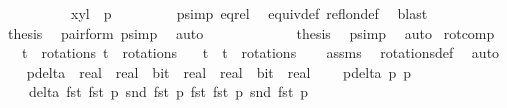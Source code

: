 \begin{isabellebody}
\ \ \isamarkupfalse%
\ {\isacharminus}\isanewline
\ \ \ \ \isamarkupfalse%
\ {\isachardoublequoteopen}{\isacharparenleft}{\isacharparenleft}x{\isacharcomma}y{\isacharparenright}{\isacharcomma}l{\isacharparenright}\ {\isasymin}\ p{\isachardoublequoteclose}\ \isanewline
\ \ \ \ \ \ \isamarkupfalse%
\ p{\isacharunderscore}simp\ eq{\isacharunderscore}rel\ \isamarkupfalse%
\ equiv{\isacharunderscore}def\ refl{\isacharunderscore}on{\isacharunderscore}def\ \isamarkupfalse%
\ blast\isanewline
\ \ \ \ \isamarkupfalse%
\ \isamarkupfalse%
\ {\isacharquery}thesis\ \isamarkupfalse%
\ pair{\isacharunderscore}form\ p{\isacharunderscore}simp\ \isamarkupfalse%
\ auto\isanewline
\ \ \isamarkupfalse%
\ \ \ \ \isanewline
\ \ \isamarkupfalse%
\ \isamarkupfalse%
\ {\isacharquery}thesis\ \isamarkupfalse%
\ p{\isacharunderscore}simp\ \isamarkupfalse%
\ auto\isanewline
{}\isamarkupfalse%
%
\endisatagproof
{\isafoldproof}%
%
\isadelimproof
\isanewline
%
\endisadelimproof
\isanewline
{}\isamarkupfalse%
\ rot{\isacharunderscore}comp{\isacharcolon}\isanewline
\ \ \ {\isachardoublequoteopen}t{}\ {\isasymin}\ rotations{\isachardoublequoteclose}\ {\isachardoublequoteopen}t{}\ {\isasymin}\ rotations{\isachardoublequoteclose}\isanewline
\ \ \ {\isachardoublequoteopen}t{}\ {\isasymcirc}\ t{}\ {\isasymin}\ rotations{\isachardoublequoteclose}\isanewline
%
\isadelimproof
\ \ %
\endisadelimproof
%
\isatagproof
{}\isamarkupfalse%
\ assms\ \isamarkupfalse%
\ rotations{\isacharunderscore}def\ \isamarkupfalse%
\ auto%
\endisatagproof
{\isafoldproof}%
%
\isadelimproof
\isanewline
%
\endisadelimproof
\isanewline
\isanewline
\ \ \isanewline
\isanewline
{}\isamarkupfalse%
\ p{\isacharunderscore}delta\ {\isacharcolon}{\isacharcolon}\ {\isachardoublequoteopen}{\isacharparenleft}real\ {\isasymtimes}\ real{\isacharparenright}\ {\isasymtimes}\ bit\ {\isasymRightarrow}\ {\isacharparenleft}real\ {\isasymtimes}\ real{\isacharparenright}\ {\isasymtimes}\ bit\ {\isasymRightarrow}\ real{\isachardoublequoteclose}\ \ \isanewline
\ \ {\isachardoublequoteopen}p{\isacharunderscore}delta\ p{}\ p{}\ {\isacharequal}\ \isanewline
\ \ \ \ delta\ {\isacharparenleft}fst\ {\isacharparenleft}fst\ p{}{\isacharparenright}{\isacharparenright}\ {\isacharparenleft}snd\ {\isacharparenleft}fst\ p{}{\isacharparenright}{\isacharparenright}\ {\isacharparenleft}fst\ {\isacharparenleft}fst\ p{}{\isacharparenright}{\isacharparenright}\ {\isacharparenleft}snd\ {\isacharparenleft}fst\ p{}{\isacharparenright}{\isacharparenright}{\isachardoublequoteclose}\isanewline

\end{isabellebody}
